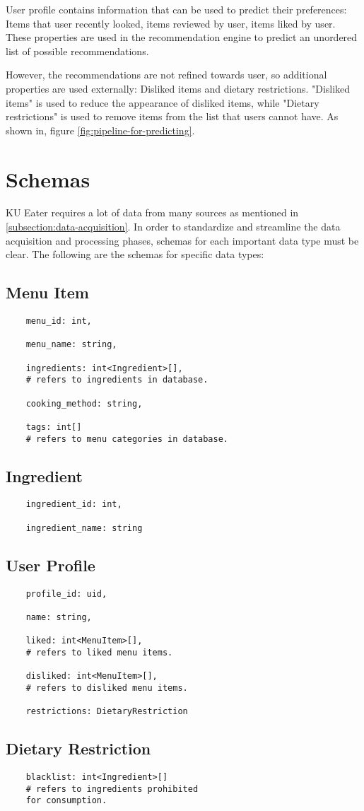 User profile contains information that can be used to predict their preferences: Items that user recently looked, items reviewed by user, items liked by user.
These properties are used in the recommendation engine to predict an unordered list of possible recommendations.

However, the recommendations are not refined towards user, so additional properties are used externally: Disliked items and dietary restrictions.
"Disliked items" is used to reduce the appearance of disliked items, while "Dietary restrictions" is used to remove items from the list that users
cannot have. As shown in, figure \ref{fig:pipeline-for-predicting}.

\section{Schemas}
\label{section:data-schema}

KU Eater requires a lot of data from many sources as mentioned in \ref{subsection:data-acquisition}. In order to standardize and streamline the
data acquisition and processing phases, schemas for each important data type must be clear. The following are the schemas for specific data types:

\subsection{Menu Item}
\label{schema:menu-item}
\begin{verbatim}
    menu_id: int,
    
    menu_name: string,
    
    ingredients: int<Ingredient>[],
    # refers to ingredients in database.
    
    cooking_method: string,
    
    tags: int[]
    # refers to menu categories in database.
\end{verbatim}

\subsection{Ingredient}
\label{schema:ingredient}
\begin{verbatim}
    ingredient_id: int,
    
    ingredient_name: string
\end{verbatim}


\subsection{User Profile}
\label{schema:user-profile}
\begin{verbatim}
    profile_id: uid,
    
    name: string,
    
    liked: int<MenuItem>[],
    # refers to liked menu items.

    disliked: int<MenuItem>[],
    # refers to disliked menu items.

    restrictions: DietaryRestriction
\end{verbatim}

\subsection{Dietary Restriction}
\label{schema:dietary-restriction}
\begin{verbatim}
    blacklist: int<Ingredient>[]
    # refers to ingredients prohibited
    for consumption.
\end{verbatim}